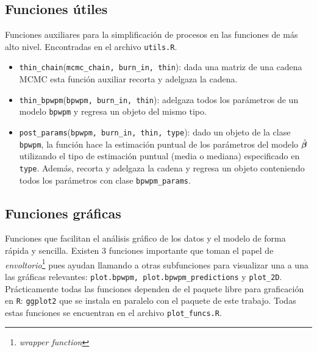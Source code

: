 \documentclass[../../Main/Main.tex]{subfiles}
\begin{document}
\subsection*{Funciones útiles}
Funciones auxiliares para la simplificación de procesos en las funciones de más alto nivel. Encontradas en el archivo \verb|utils.R|.
\begin{itemize}[label={}]
	\item \verb|thin_chain|(\verb|mcmc_chain, burn_in, thin|): dada una matriz de una cadena MCMC esta función auxiliar recorta y adelgaza la cadena.
	\item \verb|thin_bpwpm|(\verb|bpwpm, burn_in, thin|): adelgaza todos los parámetros de un modelo \verb|bpwpm| y regresa un objeto del mismo tipo. 
	\item \verb|post_params|(\verb|bpwpm, burn_in, thin, type|): dado un objeto de la clase \verb|bpwpm|, la función hace la estimación puntual de los parámetros del modelo $\hat{\bm{\beta}}$ utilizando el tipo de estimación puntual (media o mediana) especificado en \verb|type|. Además, recorta y adelgaza la cadena y regresa un objeto conteniendo todos los parámetros con clase \verb|bpwpm_params|.
\end{itemize}

\subsection*{Funciones gráficas}
Funciones que facilitan el análisis gráfico de los datos y el modelo de forma rápida y sencilla. Existen 3 funciones importante que toman el papel de  \textit{envoltorio}\footnote{\emph{wrapper function}} pues ayudan llamando a otras subfunciones para visualizar una a una las gráficas relevantes: \verb|plot.bpwpm, plot.bpwpm_predictions| y \verb|plot_2D|. Prácticamente todas las funciones dependen de el paquete libre para graficación en \verb|R|: \verb|ggplot2| que se instala en paralelo con el paquete de este trabajo. Todas estas funciones se encuentran en el archivo \verb|plot_funcs.R|.
\end{document}
